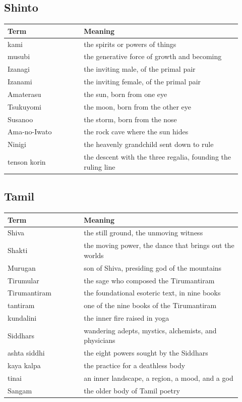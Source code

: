 \subsection{Shinto}

\begin{longtable}{L{0.30\linewidth} L{0.62\linewidth}}
\toprule
\textbf{Term} & \textbf{Meaning} \\
\midrule
\endhead
kami & the spirits or powers of things \\
musubi & the generative force of growth and becoming \\
Izanagi & the inviting male, of the primal pair \\
Izanami & the inviting female, of the primal pair \\
Amaterasu & the sun, born from one eye \\
Tsukuyomi & the moon, born from the other eye \\
Susanoo & the storm, born from the nose \\
Ama-no-Iwato & the rock cave where the sun hides \\
Ninigi & the heavenly grandchild sent down to rule \\
tenson korin & the descent with the three regalia, founding the ruling line \\
\bottomrule
\end{longtable}

\subsection{Tamil}

\begin{longtable}{L{0.30\linewidth} L{0.62\linewidth}}
\toprule
\textbf{Term} & \textbf{Meaning} \\
\midrule
\endhead
Shiva & the still ground, the unmoving witness \\
Shakti & the moving power, the dance that brings out the worlds \\
Murugan & son of Shiva, presiding god of the mountains \\
Tirumular & the sage who composed the Tirumantiram \\
Tirumantiram & the foundational esoteric text, in nine books \\
tantiram & one of the nine books of the Tirumantiram \\
kundalini & the inner fire raised in yoga \\
Siddhars & wandering adepts, mystics, alchemists, and physicians \\
ashta siddhi & the eight powers sought by the Siddhars \\
kaya kalpa & the practice for a deathless body \\
tinai & an inner landscape, a region, a mood, and a god \\
Sangam & the older body of Tamil poetry \\
\bottomrule
\end{longtable}

